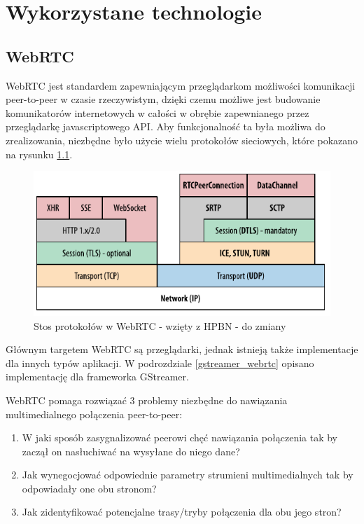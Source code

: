 \chapter{Wykorzystane technologie}

\section{WebRTC}

\cite{hpbn}

WebRTC jest standardem zapewniającym przeglądarkom możliwości komunikacji peer-to-peer w czasie
rzeczywistym, dzięki czemu możliwe jest budowanie komunikatorów internetowych w całości w obrębie
zapewnianego przez przeglądarkę javascriptowego API. Aby funkcjonalność ta była możliwa do
zrealizowania, niezbędne było użycie wielu protokołów sieciowych, które pokazano na rysunku
\ref{fig:webrtc_stack}.

\begin{figure}[htbp]
    \centering
    \includegraphics{img/webrtc-stack_hpbn}
    \caption{Stos protokołów w WebRTC - wzięty z HPBN - do zmiany}
    \label{fig:webrtc_stack}
\end{figure}

Głównym targetem WebRTC są przeglądarki, jednak istnieją także implementacje dla innych typów
aplikacji. W podrozdziale \ref{gstreamer_webrtc} opisano implementację dla frameworka GStreamer.

WebRTC pomaga rozwiązać 3 problemy niezbędne do nawiązania multimedialnego połączenia peer-to-peer:

\begin{enumerate}
    \item W jaki sposób zasygnalizować peerowi chęć nawiązania połączenia tak by zaczął on
          nasłuchiwać na wysyłane do niego dane?
    \item Jak wynegocjować odpowiednie parametry strumieni multimedialnych tak by odpowiadały one
          obu stronom?
    \item Jak zidentyfikować potencjalne trasy/tryby połączenia dla obu jego stron?
\end{enumerate}

